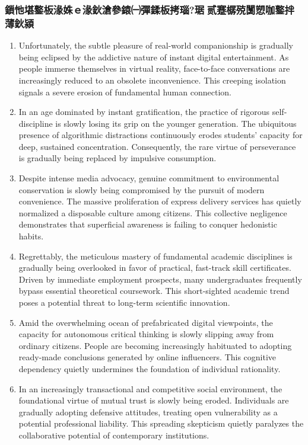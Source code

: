 ﻿\documentclass[lang=cn,11pt]{elegantbook}
\begin{document}
\subsubsection{鎻忚堪鐜板湪姝ｅ湪鈥滄參鎱㈠彈鍒板拷瑙?琚贰蹇樼殑闅愬咖鐜拌薄鈥潁}

\begin{enumerate}
\item Unfortunately, the subtle pleasure of real-world companionship is gradually being eclipsed by the addictive nature of instant digital entertainment. As people immerse themselves in virtual reality, face-to-face conversations are increasingly reduced to an obsolete inconvenience. This creeping isolation signals a severe erosion of fundamental human connection.
\item In an age dominated by instant gratification, the practice of rigorous self-discipline is slowly losing its grip on the younger generation. The ubiquitous presence of algorithmic distractions continuously erodes students' capacity for deep, sustained concentration. Consequently, the rare virtue of perseverance is gradually being replaced by impulsive consumption. 
\item Despite intense media advocacy, genuine commitment to environmental conservation is slowly being compromised by the pursuit of modern convenience. The massive proliferation of express delivery services has quietly normalized a disposable culture among citizens. This collective negligence demonstrates that superficial awareness is failing to conquer hedonistic habits.
\item Regrettably, the meticulous mastery of fundamental academic disciplines is gradually being overlooked in favor of practical, fast-track skill certificates. Driven by immediate employment prospects, many undergraduates frequently bypass essential theoretical coursework. This short-sighted academic trend poses a potential threat to long-term scientific innovation.
\item Amid the overwhelming ocean of prefabricated digital viewpoints, the capacity for autonomous critical thinking is slowly slipping away from ordinary citizens. People are becoming increasingly habituated to adopting ready-made conclusions generated by online influencers. This cognitive dependency quietly undermines the foundation of individual rationality.
\item In an increasingly transactional and competitive social environment, the foundational virtue of mutual trust is slowly being eroded. Individuals are gradually adopting defensive attitudes, treating open vulnerability as a potential professional liability. This spreading skepticism quietly paralyzes the collaborative potential of contemporary institutions.

\end{enumerate}
\end{document}
